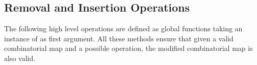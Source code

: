 \subsection{Removal and Insertion Operations}\label{ssec-operations}

The following high level operations are defined as global functions
taking an instance  of  as first
argument.  All these methods ensure that given a valid combinatorial
map and a possible operation, the modified combinatorial map is also
valid.


